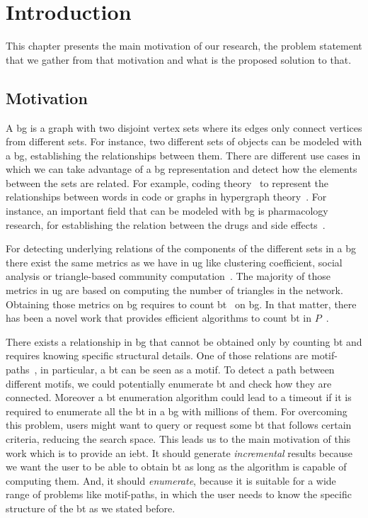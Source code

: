 \chapter{Introduction}\label{intro}
This chapter presents the main motivation of our research, the problem statement that we gather from that motivation
and what is the proposed solution to that.

\section{Motivation}\label{sec:motivation}
A \acrfull{bg} is a graph with two disjoint vertex sets where its edges only connect vertices from different sets. 
For instance, two different sets of objects can be modeled with a \acrshort{bg}, establishing the relationships between them.
There are different use cases in which we can take advantage of a \acrshort{bg} representation and detect how the elements between the sets
are related. For example, coding theory~\cite{DBLP:journals/corr/WangL13} to represent the relationships between words in code or graphs in hypergraph theory~\cite{hypergraph}. 
For instance, an important field that can be modeled with \acrshort{bg} is pharmacology research, for establishing the relation between the drugs and side effects~\cite{drugs}.

For detecting underlying relations of the components of the different sets in a \acrshort{bg} there exist the same metrics as we have in \acrfull{ug} like clustering coefficient, social analysis or triangle-based community computation~\cite{ccoef,detect_graph,Newman_2003}.
The majority of those metrics in \acrshort{ug} are based on computing the number of triangles in the network. Obtaining those metrics on \acrshort{bg} requires to count \acrfull{bt}~\cite{opsahl} on \acrshort{bg}.
In that matter, there has been a novel work that provides efficient algorithms to count \acrshort{bt} in $P$~\cite{btcount}.

There exists a relationship in \acrshort{bg} that cannot be obtained only by counting \acrshort{bt} and requires knowing specific
structural details. One of those relations are motif-paths~\cite{Li2019MotifPA}, in particular, a \acrshort{bt} can be seen as a motif. To detect a path between different motifs, we could potentially enumerate \acrshort{bt} and check how they are connected.
Moreover a \acrshort{bt} enumeration algorithm could lead to a timeout if it is required to enumerate all the \acrshort{bt} in a \acrshort{bg} with millions of them. For overcoming this problem, users might want to query or request some \acrshort{bt} that follows certain criteria, reducing the search space. 
This leads us to the main motivation of this work which is to provide an \acrfull{iebt}. It should generate \emph{incremental} results because we want the user to be able to obtain \acrshort{bt} as long as the algorithm is capable of computing them. 
And, it should \emph{enumerate}, because it is suitable for a wide range of problems like motif-paths, in which the user needs to know the specific structure of the \acrshort{bt} as we stated before.

